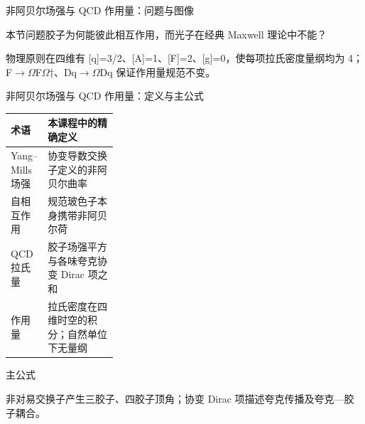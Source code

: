 \begin{frame}[t]{非阿贝尔场强与 QCD 作用量：问题与图像}
\footnotesize
\begin{block}{本节问题}胶子为何能彼此相互作用，而光子在经典 Maxwell 理论中不能？\end{block}
\begin{block}{物理原则}\quad 在四维有 [q]=3/\allowbreak{}2、[A]=1、[F]=2、[g]=0，使每项拉氏密度量纲均为 4；F\ensuremath{\rightarrow}\ensuremath{\Omega}F\ensuremath{\Omega}†、Dq\ensuremath{\rightarrow}\ensuremath{\Omega}Dq 保证作用量规范不变。\end{block}
\end{frame}

\begin{frame}[t]{非阿贝尔场强与 QCD 作用量：定义与主公式}
\footnotesize\begin{tabularx}{\linewidth}{p{0.30\linewidth}Y}
\toprule 术语 & 本课程中的精确定义\\\midrule
{} Yang--Mills 场强 & 协变导数交换子定义的非阿贝尔曲率\\
 自相互作用 & 规范玻色子本身携带非阿贝尔荷\\
 QCD 拉氏量 & 胶子场强平方与各味夸克协变 Dirac 项之和\\
 作用量 & 拉氏密度在四维时空的积分；自然单位下无量纲\\
\bottomrule\end{tabularx}\vspace{0.15cm}
\begin{block}{ 主公式}\centering{}\end{block}
非对易交换子产生三胶子、四胶子顶角；协变 Dirac 项描述夸克传播及夸克—胶子耦合。
\end{frame}

